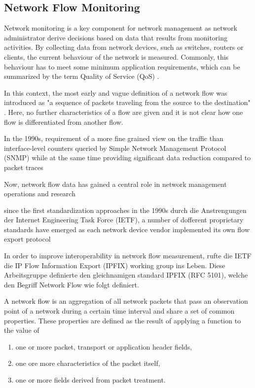 \subsection{Network Flow Monitoring}

Network monitoring is a key component for network management as network administrator derive decisions based on data that results from monitoring activities. By collecting data from network devices, such as switches, routers or clients, the current behaviour of the network is measured. Commonly, this behaviour has to meet some minimum application requirements, which can be summarized by the term Quality of Service (QoS) \cite[406]{tanenbaum2021computer}.


In this context, the most early and vague definition of a network flow was introduced as "a sequence of packets traveling from the source to the destination" \cite{clark1988design}. Here, no further characteristics of a flow are given and it is not clear how one flow is differentiated from another flow. 

In the 1990s, requirement of a more fine grained view on the traffic than interface-level counters queried by Simple Network Management Protocol (SNMP) while at the same time providing significant data reduction compared to packet traces

Now, network flow data has gained a central role in network management operations and research \cite{trammell2011introduction}

since the first standardization approaches in the 1990s durch die Anstrengungen der Internet Engineering Task Force (IETF), a number of dofferent proprietary standards have emerged as each network device vendor implemented its own flow export protocol

In order to improve interoperability in network flow measurement, rufte die IETF die IP Flow Information Export (IPFIX) working group ins Leben. Diese Arbeitsgruppe definierte den gleichnamigen standard IPFIX (RFC 5101), welche den Begriff Network Flow wie folgt definiert.

A network flow is an aggregation of all network packets that pass an observation point of a network during a certain time interval and share a set of common properties. These properties are defined as the result of applying a function to the value of
\begin{enumerate}
    \item one or more packet, transport or application header fields,
    \item one ore more characteristics of the packet itself,
    \item one or more fields derived from packet treatment.
\end{enumerate}


